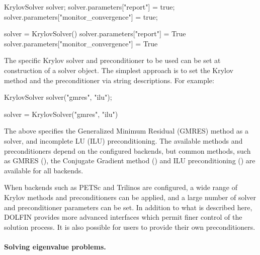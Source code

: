 \begin{c++}
KrylovSolver solver;
solver.parameters["report"] = true;
solver.parameters["monitor_convergence"] = true;
\end{c++}

\begin{python}
solver = KrylovSolver()
solver.parameters["report"] = True
solver.parameters["monitor_convergence"] = True
\end{python}
The specific Krylov solver and preconditioner to be used can be set at
construction of a solver object. The simplest approach is to set the
Krylov method and the preconditioner via string descriptions. For example:

\begin{c++}
KrylovSolver solver("gmres", "ilu");
\end{c++}

\begin{python}
solver = KrylovSolver("gmres", "ilu")
\end{python}
The above specifies the Generalized Minimum Residual (GMRES) method as
a solver, and incomplete LU (ILU) preconditioning. The available
methods and preconditioners depend on the configured backends, but
common methods, such as GMRES (), the Conjugate Gradient method
() and ILU preconditioning () are available for all backends.

When backends such as PETSc and Trilinos are configured, a wide range
of Krylov methods and preconditioners can be applied, and a large number
of solver and preconditioner parameters can be set. In addition to what
is described here, DOLFIN provides more advanced interfaces which permit
finer control of the solution process. It is also possible for users to
provide their own preconditioners.

\paragraph{Solving eigenvalue problems.}

